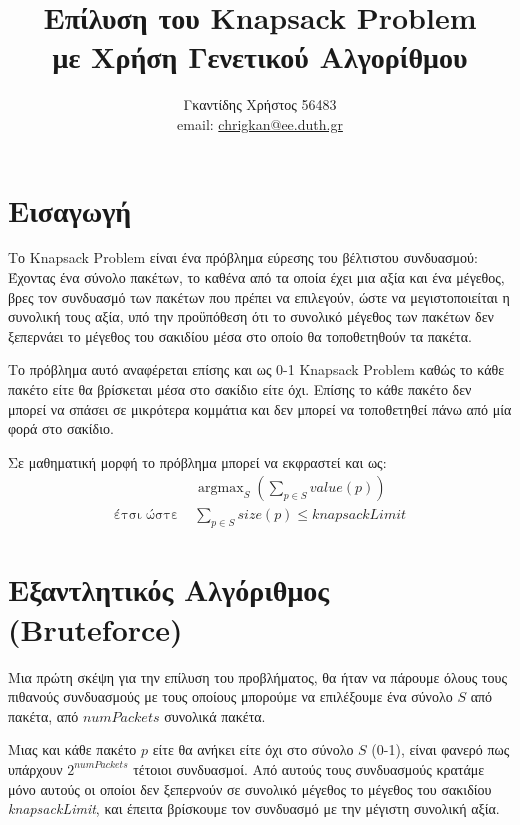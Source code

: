 \documentclass{article}
\title{Επίλυση του Knapsack Problem\\με Χρήση Γενετικού Αλγορίθμου}
\date{\DTMtoday}
\author{Γκαντίδης Χρήστος 56483 \\ email: \href{mailto:chrigkan@ee.duth.gr}{chrigkan@ee.duth.gr}}
\DeclareMathOperator*{\argmax}{argmax}
\begin{document}
\maketitle
\newpage

\tableofcontents
\newpage


\section{Εισαγωγή}

Το Knapsack Problem είναι ένα πρόβλημα εύρεσης του βέλτιστου συνδυασμού: Έχοντας
ένα σύνολο πακέτων, το καθένα από τα οποία έχει μια αξία και ένα μέγεθος, βρες
τον συνδυασμό των πακέτων που πρέπει να επιλεγούν, ώστε να μεγιστοποιείται η
συνολική τους αξία, υπό την προϋπόθεση ότι το συνολικό μέγεθος των πακέτων δεν
ξεπερνάει το μέγεθος του σακιδίου μέσα στο οποίο θα τοποθετηθούν τα πακέτα.

Το πρόβλημα αυτό αναφέρεται επίσης και ως 0-1 Knapsack Problem καθώς το κάθε
πακέτο είτε θα βρίσκεται μέσα στο σακίδιο είτε όχι. Επίσης το κάθε πακέτο δεν
μπορεί να σπάσει σε μικρότερα κομμάτια και δεν μπορεί να τοποθετηθεί πάνω από
μία φορά στο σακίδιο.

Σε μαθηματική μορφή το πρόβλημα μπορεί να εκφραστεί και ως:
\begin{align*}
    &\argmax_{S}\left(\sum_{p \in S}\textit{value}(p)\right)\\
    \text{έτσι ώστε } &\sum_{p \in S}\textit{size}(p) \leq \textit{knapsackLimit}
\end{align*}

\section{Εξαντλητικός Αλγόριθμος (Bruteforce)}

Μια πρώτη σκέψη για την επίλυση του προβλήματος, θα ήταν να πάρουμε όλους τους
πιθανούς συνδυασμούς με τους οποίους μπορούμε να επιλέξουμε ένα σύνολο $S$ από
πακέτα, από $\textit{numPackets}$ συνολικά πακέτα.

Μιας και κάθε πακέτο $p$ είτε θα ανήκει είτε όχι στο σύνολο $S$ (0-1), είναι
φανερό πως υπάρχουν $2^{\textit{numPackets}}$ τέτοιοι συνδυασμοί. Από αυτούς
τους συνδυασμούς κρατάμε μόνο αυτούς οι οποίοι δεν ξεπερνούν σε συνολικό μέγεθος
το μέγεθος του σακιδίου \textit{knapsackLimit}, και έπειτα βρίσκουμε τον
συνδυασμό με την μέγιστη συνολική αξία.
\end{document}
